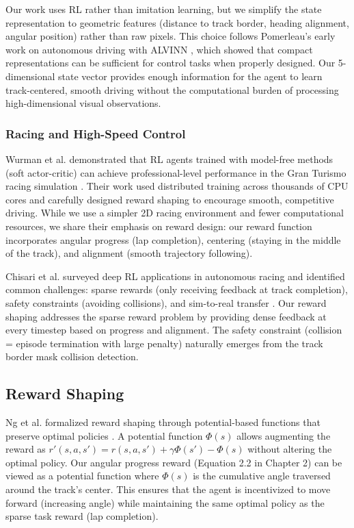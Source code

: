 Our work uses RL rather than imitation learning, but we simplify the state representation to geometric features (distance to track border, heading alignment, angular position) rather than raw pixels. This choice follows Pomerleau's early work on autonomous driving with ALVINN \cite{pomerleau1989alvinn}, which showed that compact representations can be sufficient for control tasks when properly designed. Our 5-dimensional state vector provides enough information for the agent to learn track-centered, smooth driving without the computational burden of processing high-dimensional visual observations.

\subsubsection{Racing and High-Speed Control}

Wurman et al. demonstrated that RL agents trained with model-free methods (soft actor-critic) can achieve professional-level performance in the Gran Turismo racing simulation \cite{wurman2022outracing}. Their work used distributed training across thousands of CPU cores and carefully designed reward shaping to encourage smooth, competitive driving. While we use a simpler 2D racing environment and fewer computational resources, we share their emphasis on reward design: our reward function incorporates angular progress (lap completion), centering (staying in the middle of the track), and alignment (smooth trajectory following).

Chisari et al. surveyed deep RL applications in autonomous racing and identified common challenges: sparse rewards (only receiving feedback at track completion), safety constraints (avoiding collisions), and sim-to-real transfer \cite{chisari2022survey}. Our reward shaping addresses the sparse reward problem by providing dense feedback at every timestep based on progress and alignment. The safety constraint (collision = episode termination with large penalty) naturally emerges from the track border mask collision detection.

\subsection{Reward Shaping}

Ng et al. formalized reward shaping through potential-based functions that preserve optimal policies \cite{ng1999policy}. A potential function $\Phi(s)$ allows augmenting the reward as $r'(s, a, s') = r(s, a, s') + \gamma \Phi(s') - \Phi(s)$ without altering the optimal policy. Our angular progress reward (Equation 2.2 in Chapter 2) can be viewed as a potential function where $\Phi(s)$ is the cumulative angle traversed around the track's center. This ensures that the agent is incentivized to move forward (increasing angle) while maintaining the same optimal policy as the sparse task reward (lap completion).

